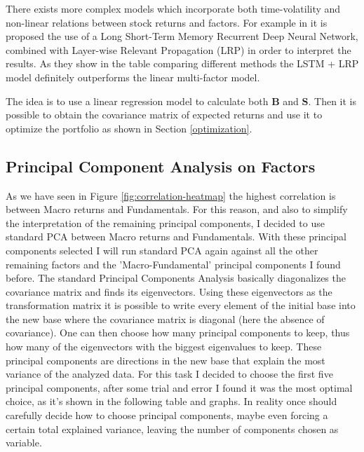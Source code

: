 There exists more complex models which incorporate both time-volatility and non-linear relations between stock returns and factors. For example in \cite{nakagawa} it is proposed the use of a Long Short-Term Memory Recurrent Deep Neural Network, combined with Layer-wise Relevant Propagation (LRP) in order to interpret the results. As they show in the table comparing different methods the LSTM + LRP model definitely outperforms the linear multi-factor model.

The idea is to use a linear regression model to calculate both $\mathbf{B}$ and $\mathbf{S}$. Then it is possible to obtain the covariance matrix of expected returns and use it to optimize the portfolio as shown in Section \ref{optimization}.

\subsection{Principal Component Analysis on Factors}
As we have seen in Figure \ref{fig:correlation-heatmap} the highest correlation is between Macro returns and Fundamentals. For this reason, and also to simplify the interpretation of the remaining principal components, I decided to use standard PCA between Macro returns and Fundamentals. With these principal components selected I will run standard PCA again against all the other remaining factors and the 'Macro-Fundamental' principal components I found before.
The standard Principal Components Analysis basically diagonalizes the covariance matrix and finds its eigenvectors. Using these eigenvectors as the transformation matrix it is possible to write every element of the initial base into the new base where the covariance matrix is diagonal (here the absence of covariance). One can then choose how many principal components to keep, thus how many of the eigenvectors with the biggest eigenvalues to keep. These principal components are directions in the new base that explain the most variance of the analyzed data. For this task I decided to choose the first five principal components, after some trial and error I found it was the most optimal choice, as it's shown in the following table and graphs. In reality once should carefully decide how to choose principal components, maybe even forcing a certain total explained variance, leaving the number of components chosen as variable.

